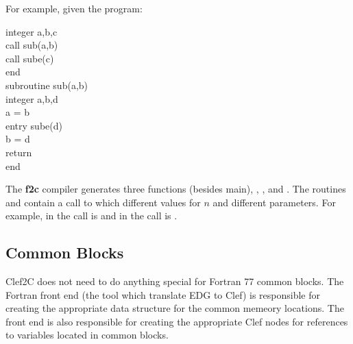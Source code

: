 For example, given the program:
\begin{codeseq}
\>\>integer a,b,c \\
\>\>call sub(a,b)\\
\>\>call sube(c)\\
\>\>end \\
\>\>subroutine sub(a,b) \\
\>\>integer a,b,d \\
\>\>a = b \\
\>\>entry sube(d)\\
\>\>b = d \\
\>\>return \\
\>\>end\\
\end{codeseq}

The \textbf{f2c} compiler generates three functions (besides main),
, , and .  
The routines  and  contain a call to 
 which different values for $n$ and different parameters.
For example, in  the call is 
and in  the call is .

\subsection{Common Blocks}

Clef2C does not need to do anything special for Fortran 77 common
blocks.  The Fortran front end (\ie the tool which translate EDG to
Clef) is responsible for creating the appropriate data structure for
the common memeory locations.  The front end is also responsible for
creating the appropriate Clef nodes for references to variables
located in common blocks.
